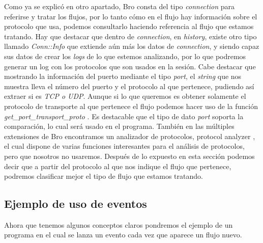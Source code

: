 Como ya se explicó en otro apartado, Bro consta del tipo \textit{connection} \cite{connectiontype} 
para referirse y tratar los flujos, por lo tanto cómo en el flujo hay 
información sobre el protocolo que usa, podemos consultarlo haciendo 
referencia al flujo que estamos tratando. Hay que destacar que dentro 
de \textit{connection}, en \textit{history}, existe otro tipo llamado \textit{Conn::Info} \cite{conntype} que 
extiende aún más los datos de \textit{connection}, y siendo capaz sus datos de 
crear los \textit{logs} de lo que estemos analizando, por lo que podremos generar 
un log con los protocolos que son usados en la sesión. Cabe destacar que 
mostrando la información del puerto mediante el tipo \textit{port}, el \textit{string} que 
nos muestra lleva el número del puerto y el protocolo al que pertenece, 
pudiendo así extraer si es \textit{TCP o UDP}. Aunque si lo que queremos es 
obtener solamente el protocolo de transporte al que pertenece el flujo 
podemos hacer uso de la función \textit{get\_port\_transport\_proto} \cite{getproto}.
\intro
Es destacable que el tipo de dato  \textit{port} soporta la comparación, lo cual 
será usado en el programa.  
\intro
También en las múltiples extensiones de Bro encontramos un analizador 
de protocolos, protocol analyzer \cite{protoanalyzer}, el cual dispone de varias funciones 
interesantes para el análisis de protocolos, pero que nosotros no usaremos.
\intro
Después de lo expuesto en esta sección podemos decir que a partir del protocolo al que 
nos indique el flujo que pertenece, podremos clasificar mejor el tipo de flujo que estamos 
tratando.

\subsection{Ejemplo de uso de eventos}

Ahora que tenemos algunos conceptos claros pondremos el ejemplo de un 
programa en el cual se lanza un evento cada vez que aparece un flujo nuevo.
\intro

